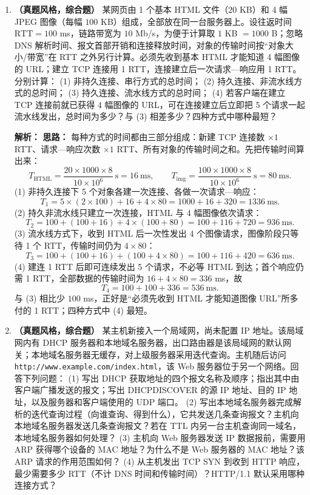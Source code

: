 \begin{enumerate}
\item \textbf{（真题风格，综合题）} 某网页由 1 个基本 HTML 文件（$20$ KB）和 4 幅 JPEG 图像（每幅 $100$ KB）组成，全部放在同一台服务器上。设往返时间 $\mathrm{RTT}=100$ ms，链路带宽为 $10$ Mb/s，为便于计算取 $1$ KB $=1000$ B；忽略 DNS 解析时间、报文首部开销和连接释放时间，对象的传输时间按“对象大小/带宽”在 RTT 之外另行计算。必须先收到基本 HTML 才能知道 4 幅图像的 URL；建立 TCP 连接用 1 RTT，连接建立后一次请求—响应用 1 RTT。分别计算：
(1) 非持久连接、串行方式的总时间；
(2) 持久连接、非流水线方式的总时间；
(3) 持久连接、流水线方式的总时间；
(4) 若客户端在建立 TCP 连接前就已获得 4 幅图像的 URL，可在连接建立后立即把 5 个请求一起流水线发出，总时间为多少？与 (3) 相差多少？四种方式中哪种最短？

\ifshowsolutions\par\noindent\textbf{解析：}
\textbf{思路：} 每种方式的时间都由三部分组成：新建 TCP 连接数 $\times 1$ RTT、请求—响应次数 $\times 1$ RTT、所有对象的传输时间之和。先把传输时间算出来：
\[
T_{\text{HTML}}=\frac{20\times1000\times8}{10\times10^{6}}\ \mathrm{s}=16\ \mathrm{ms},
\qquad
T_{\text{img}}=\frac{100\times1000\times8}{10\times10^{6}}\ \mathrm{s}=80\ \mathrm{ms}.
\]
(1) 非持久连接下 5 个对象各建一次连接、各做一次请求—响应：
\[
T_1=5\times(2\times100)+16+4\times80=1000+16+320=1336\ \mathrm{ms}.
\]
(2) 持久非流水线只建立一次连接，HTML 与 4 幅图像依次请求：
\[
T_2=100+(100+16)+4\times(100+80)=100+116+720=936\ \mathrm{ms}.
\]
(3) 流水线方式下，收到 HTML 后一次性发出 4 个图像请求，图像阶段只等待 1 个 RTT，传输时间仍为 $4\times80$：
\[
T_3=100+(100+16)+(100+4\times80)=100+116+420=636\ \mathrm{ms}.
\]
(4) 建连 1 RTT 后即可连续发出 5 个请求，不必等 HTML 到达；首个响应仍需 1 RTT，全部数据的传输时间为 $16+4\times80=336$ ms，故
\[
T_4=100+100+336=536\ \mathrm{ms}.
\]
与 (3) 相比少 $100$ ms，正好是“必须先收到 HTML 才能知道图像 URL”所多付的 1 RTT；四种方式中 (4) 最短。
\else \answerarea[10] \fi

\item \textbf{（真题风格，综合题）} 某主机新接入一个局域网，尚未配置 IP 地址。该局域网内有 DHCP 服务器和本地域名服务器，出口路由器是该局域网的默认网关；本地域名服务器无缓存，对上级服务器采用迭代查询。主机随后访问 \texttt{http://www.example.com/index.html}，该 Web 服务器位于另一个网络。回答下列问题：
(1) 写出 DHCP 获取地址的四个报文名称及顺序；指出其中由客户端广播发送的报文；写出 DHCPDISCOVER 的源 IP 地址、目的 IP 地址，以及服务器和客户端使用的 UDP 端口。
(2) 写出本地域名服务器完成解析的迭代查询过程（向谁查询、得到什么），它共发送几条查询报文？主机向本地域名服务器发送几条查询报文？若在 TTL 内另一台主机查询同一域名，本地域名服务器如何处理？
(3) 主机向 Web 服务器发送 IP 数据报前，需要用 ARP 获得哪个设备的 MAC 地址？为什么不是 Web 服务器的 MAC 地址？该 ARP 请求的作用范围如何？
(4) 从主机发出 TCP SYN 到收到 HTTP 响应，最少需要多少 RTT（不计 DNS 时间和传输时间）？HTTP/1.1 默认采用哪种连接方式？


\end{enumerate}
